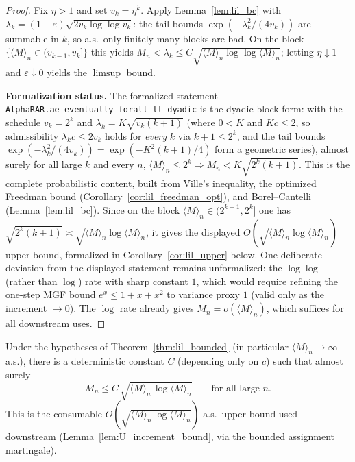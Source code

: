 \begin{proof}
Fix $\eta>1$ and set $v_k = \eta^k$. Apply Lemma~\ref{lem:lil_bc} with
$\lambda_k=(1+\varepsilon)\sqrt{2v_k\log\log v_k}$: the tail bounds
$\exp(-\lambda_k^2/(4v_k))$ are summable in $k$, so a.s.\ only finitely many blocks are
bad. On the block $\{\langle M\rangle_n\in(v_{k-1},v_k]\}$ this yields
$M_n < \lambda_k \le C\sqrt{\langle M\rangle_n\log\log\langle M\rangle_n}$; letting
$\eta\downarrow1$ and $\varepsilon\downarrow0$ yields the $\limsup$ bound.

\textbf{Formalization status.} The formalized statement
\texttt{AlphaRAR.ae\_eventually\_forall\_lt\_dyadic} is the dyadic-block form: with the schedule
$v_k=2^k$ and $\lambda_k = K\sqrt{v_k(k+1)}$ (where $0<K$ and $Kc\le2$, so admissibility
$\lambda_k c\le 2v_k$ holds for \emph{every} $k$ via $k+1\le 2^k$, and the tail bounds
$\exp(-\lambda_k^2/(4v_k))=\exp(-K^2(k+1)/4)$ form a geometric series), almost surely for all
large $k$ and every $n$, $\langle M\rangle_n\le 2^k \Rightarrow M_n < K\sqrt{2^k(k+1)}$. This is
the complete probabilistic content, built from Ville's inequality, the optimized Freedman bound
(Corollary~\ref{cor:lil_freedman_opt}), and Borel--Cantelli (Lemma~\ref{lem:lil_bc}). Since on the
block $\langle M\rangle_n\in(2^{k-1},2^k]$ one has $\sqrt{2^k(k+1)}\asymp
\sqrt{\langle M\rangle_n\log\langle M\rangle_n}$, it gives the displayed
$O(\sqrt{\langle M\rangle_n\log\langle M\rangle_n})$ upper bound, formalized in
Corollary~\ref{cor:lil_upper} below. One deliberate deviation from the displayed statement remains
unformalized: the $\log\log$ (rather than $\log$) rate with sharp constant $1$, which would require
refining the one-step MGF bound $e^x\le1+x+x^2$ to variance proxy $1$ (valid only as the increment
$\to0$). The $\log$ rate already gives $M_n=o(\langle M\rangle_n)$, which suffices for all
downstream uses.
\end{proof}

\begin{corollary}\label{cor:lil_upper}
Under the hypotheses of Theorem~\ref{thm:lil_bounded} (in particular $\langle M\rangle_n\to\infty$
a.s.), there is a deterministic constant $C$ (depending only on $c$) such that almost surely
\[
  M_n \le C\,\sqrt{\langle M\rangle_n\,\log\langle M\rangle_n}\qquad\text{for all large }n.
\]
This is the consumable $O(\sqrt{\langle M\rangle_n\log\langle M\rangle_n})$ a.s.\ upper bound used
downstream (Lemma~\ref{lem:U_increment_bound}, via the bounded assignment martingale).
\end{corollary}

